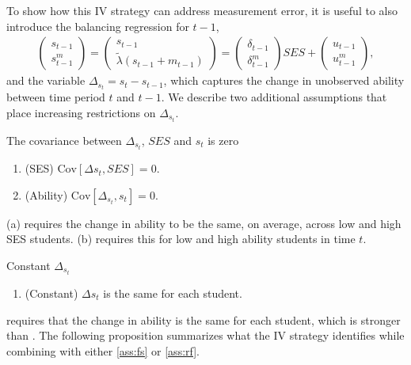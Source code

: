To show how this IV strategy can address measurement error, it is useful to also introduce the balancing regression for $t-1$,
\begin{align}\label{eqn:balancing_tmin1}
 \begin{pmatrix} s_{t-1} \\ s_{t-1}^m \end{pmatrix}= \begin{pmatrix} s_{t-1} \\ \widetilde{\lambda} (s_{t-1}+m_{t-1}) \end{pmatrix}=\begin{pmatrix} \delta_{t-1} \\ \delta_{t-1}^m   \end{pmatrix} SES +  \begin{pmatrix}  u_{t-1}  \\ u^m_{t-1} \end{pmatrix},
\end{align} 
and the variable $\Delta_{s_{t}}=s_t-s_{t-1}$, which captures the change in unobserved ability between time period $t$ and $t-1$. We describe two additional assumptions that place increasing restrictions on $\Delta_{s_{t}}$. 
\begin{assumption}\label{ass:fs}
The covariance between $\Delta_{s_t}$, $SES$ and $s_{t}$ is zero 
\renewcommand{\theenumi}{\alph{enumi}}
\begin{enumerate}
    \item (SES) $\mathrm{Cov}[\Delta{s_{t}},SES]=0$.
    \item (Ability) $\mathrm{Cov}[\Delta_{s_{t}},s_{t}]=0$.
    \end{enumerate} 
\end{assumption}
\noindent {}(a) requires the change in ability to be the same, on average, across low and high SES students. (b) requires this for low and high ability students in time $t$. 
\begin{assumption}\label{ass:rf}
Constant $\Delta_{s_t}$
\renewcommand{\theenumi}{\alph{enumi}}
\begin{enumerate}
    \item[] (Constant) $\Delta{s_{t}}$ is the same for each student.
    \end{enumerate} 
\end{assumption}
\noindent {} requires that the change in ability is the same for each student, which is stronger than . The following proposition summarizes what the IV strategy identifies while combining  with either \ref{ass:fs} or \ref{ass:rf}.
